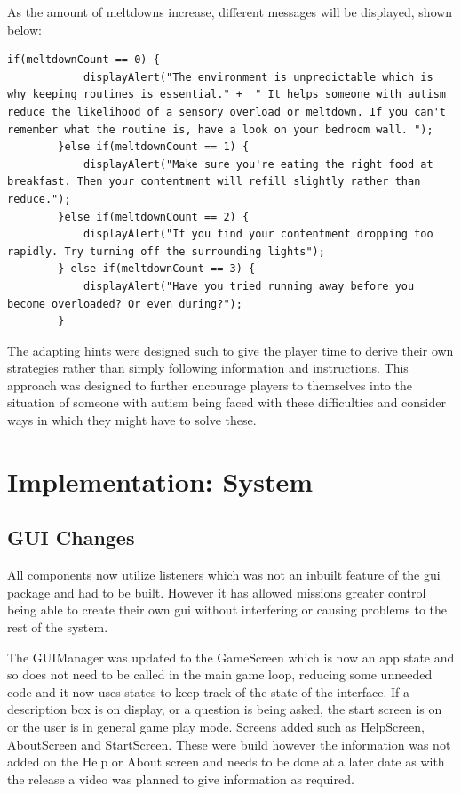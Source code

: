 \documentclass[11pt]{report}
\begin{document}
As the amount of meltdowns increase, different messages will be displayed, shown below:

\begin{lstlisting}[breaklines=true]
        if(meltdownCount == 0) {
            displayAlert("The environment is unpredictable which is why keeping routines is essential." +  " It helps someone with autism reduce the likelihood of a sensory overload or meltdown. If you can't remember what the routine is, have a look on your bedroom wall. ");
        }else if(meltdownCount == 1) {
            displayAlert("Make sure you're eating the right food at breakfast. Then your contentment will refill slightly rather than reduce.");         
        }else if(meltdownCount == 2) {
            displayAlert("If you find your contentment dropping too rapidly. Try turning off the surrounding lights");
        } else if(meltdownCount == 3) {
            displayAlert("Have you tried running away before you become overloaded? Or even during?");
        }
\end{lstlisting}

The adapting hints were designed such to give the player time to derive their own strategies rather than simply following information and instructions. This approach was designed to further encourage players to themselves into the situation of someone with autism being faced with these difficulties and consider ways in which they might have to solve these. 

\section{Implementation: System}
\subsection{GUI Changes}
All components now utilize listeners which was not an inbuilt feature of the gui package and had to be built. However it has allowed missions greater control being able to create their own gui without interfering or causing problems to the rest of the system.

The GUIManager was updated to the GameScreen which is now an app state and so does not need to be called in the main game loop, reducing some unneeded code and it now uses states to keep track of the state of the interface. If a description box is on display, or a question is being asked, the start screen is on or the user is in general game play mode. Screens added such as HelpScreen, AboutScreen and StartScreen. These were build however the information was not added on the Help or About screen and needs to be done at a later date as with the release a video was planned to give information as required. 
\end{document}
